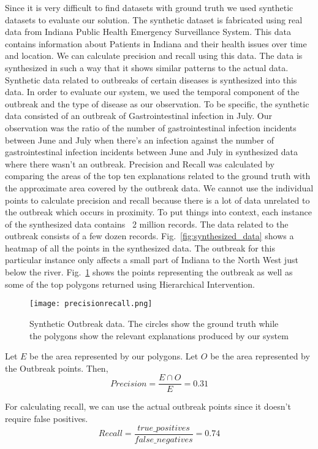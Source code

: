 Since it is very difficult to find datasets with ground truth we used synthetic datasets to evaluate our solution\citep{maciejewski2009generating}. The synthetic dataset is fabricated using real data from Indiana Public Health Emergency Surveillance System. This data contains information about Patients in Indiana and their health issues over time and location. We can calculate precision and recall using this data\citep{powers2011evaluation}. The data is synthesized in such a way that it shows similar patterns to the actual data. Synthetic data related to outbreaks of certain diseases is synthesized into this data. In order to evaluate our system, we used the temporal component of the outbreak and the type of disease as our observation. To be specific, the synthetic data consisted of an outbreak of Gastrointestinal infection in July. Our observation was the ratio of the number of gastrointestinal infection incidents between June and July when there's an infection against the number of gastrointestinal infection incidents between June and July in synthesized data where there wasn't an outbreak. Precision and Recall was calculated by comparing the areas of the top ten explanations related to the ground truth with the approximate area covered by the outbreak data. We cannot use the individual points to calculate precision and recall because there is a lot of data unrelated to the outbreak which occurs in proximity. To put things into context, each instance of the synthesized data contains ~2 million records. The data related to the outbreak consists of a few dozen records. Fig.~\ref{fig:synthesized_data} shows a heatmap of all the points in the synthesized data. The outbreak for this particular instance only affects a small part of Indiana to the North West just below the river. Fig.~\ref{fig:precisionrecall} shows the points representing the outbreak as well as some of the top polygons returned using Hierarchical Intervention. 

\begin{figure}[h]
\texttt{[image: precisionrecall.png]}
\caption{Synthetic Outbreak data. The circles show the ground truth while the polygons show the relevant explanations produced by our system}
\label{fig:precisionrecall}
\end{figure}

Let $E$ be the area represented by our polygons. Let $O$ be the area represented by the Outbreak points. Then,
$$Precision = \frac{E \cap O}{E} = 0.31$$

For calculating recall, we can use the actual outbreak points since it doesn't require false positives.
$$Recall = \frac{true\_positives}{false\_negatives} = 0.74$$




